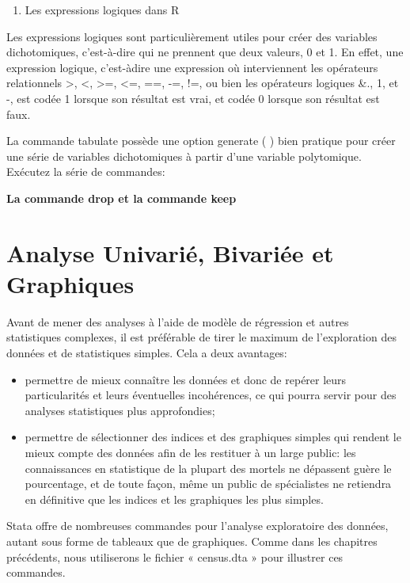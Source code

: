 \documentclass[
]{book}
\providecommand{\tightlist}{%
  \setlength{\itemsep}{0pt}\setlength{\parskip}{0pt}}
\begin{document}
\begin{enumerate}
\def\labelenumi{(\arabic{enumi})}
\setcounter{enumi}{2}
\tightlist
\item
  Les expressions logiques dans R
\end{enumerate}

Les expressions logiques sont particulièrement utiles pour créer
des variables dichotomiques, c'est-à-dire qui ne prennent que
deux valeurs, 0 et 1. En effet, une expression logique, c'est-àdire
une expression où interviennent les opérateurs relationnels
\textgreater, \textless, \textgreater=, \textless=, ==, -=, !=, ou bien les opérateurs logiques \&., 1, et
-, est codée 1 lorsque son résultat est vrai, et codée 0 lorsque
son résultat est faux.

La commande tabulate possède une option generate ( ) bien
pratique pour créer une série de variables dichotomiques à partir
d'une variable polytomique. Exécutez la série de commandes:

\textbf{La commande drop et la commande keep}

\hypertarget{analyse-univariuxe9-bivariuxe9e-et-graphiques}{%
\chapter{Analyse Univarié, Bivariée et Graphiques}\label{analyse-univariuxe9-bivariuxe9e-et-graphiques}}

Avant de mener des analyses à l'aide de modèle de régression et
autres statistiques complexes, il est préférable de tirer le
maximum de l'exploration des données et de statistiques
simples. Cela a deux avantages:

\begin{itemize}
\tightlist
\item
  permettre de mieux connaître les données et donc de repérer
  leurs particularités et leurs éventuelles incohérences, ce qui
  pourra servir pour des analyses statistiques plus
  approfondies;
\item
  permettre de sélectionner des indices et des graphiques
  simples qui rendent le mieux compte des données afin de les
  restituer à un large public: les connaissances en statistique de
  la plupart des mortels ne dépassent guère le pourcentage, et
  de toute façon, même un public de spécialistes ne retiendra en
  définitive que les indices et les graphiques les plus simples.
\end{itemize}

Stata offre de nombreuses commandes pour l'analyse
exploratoire des données, autant sous forme de tableaux que de
graphiques. Comme dans les chapitres précédents, nous
utiliserons le fichier « census.dta » pour illustrer ces
commandes.
\end{document}
